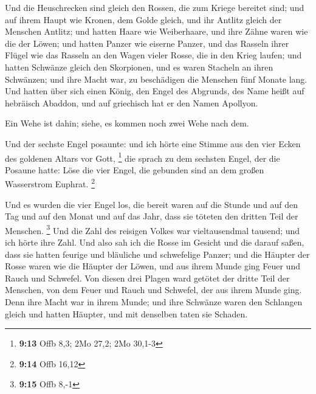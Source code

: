  Und die Heuschrecken sind gleich den Rossen, die zum
Kriege bereitet sind; und auf ihrem Haupt wie Kronen, dem Golde gleich,
und ihr Antlitz gleich der Menschen Antlitz;  und hatten
Haare wie Weiberhaare, und ihre Zähne waren wie die der Löwen;
 und hatten Panzer wie eiserne Panzer, und das Rasseln
ihrer Flügel wie das Rasseln an den Wagen vieler Rosse, die in den Krieg
laufen;  und hatten Schwänze gleich den Skorpionen, und
es waren Stacheln an ihren Schwänzen; und ihre Macht war, zu beschädigen
die Menschen fünf Monate lang.  Und hatten über sich
einen König, den Engel des Abgrunds, des Name heißt auf hebräisch
Abaddon, und auf griechisch hat er den Namen Apollyon.

 Ein Wehe ist dahin; siehe, es kommen noch zwei Wehe nach
dem.

 Und der sechste Engel posaunte: und ich hörte eine
Stimme aus den vier Ecken des goldenen Altars vor Gott, \footnote{\textbf{9:13}
  Offb 8,3; 2Mo 27,2; 2Mo 30,1-3}  die sprach zu dem
sechsten Engel, der die Posaune hatte: Löse die vier Engel, die gebunden
sind an dem großen Wasserstrom Euphrat. \footnote{\textbf{9:14} Offb
  16,12}

 Und es wurden die vier Engel los, die bereit waren auf
die Stunde und auf den Tag und auf den Monat und auf das Jahr, dass sie
töteten den dritten Teil der Menschen. \footnote{\textbf{9:15} Offb 8,-1}
 Und die Zahl des reisigen Volkes war vieltausendmal
tausend; und ich hörte ihre Zahl.  Und also sah ich die
Rosse im Gesicht und die darauf saßen, dass sie hatten feurige und
bläuliche und schwefelige Panzer; und die Häupter der Rosse waren wie
die Häupter der Löwen, und aus ihrem Munde ging Feuer und Rauch und
Schwefel.  Von diesen drei Plagen ward getötet der dritte
Teil der Menschen, von dem Feuer und Rauch und Schwefel, der aus ihrem
Munde ging.  Denn ihre Macht war in ihrem Munde; und ihre
Schwänze waren den Schlangen gleich und hatten Häupter, und mit
denselben taten sie Schaden.

